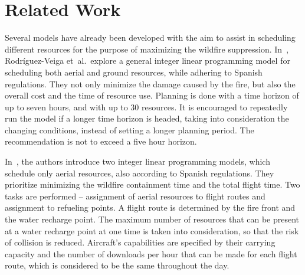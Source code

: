 \chapter{Related Work}\label{chap:related-work}

Several models have already been developed with the aim to assist in scheduling different resources for the purpose of maximizing the wildfire suppression.
In~\cite{Veiga/FullScheduler}, Rodríguez-Veiga et~al.\ explore a general integer linear programming model for scheduling both aerial and ground resources, while adhering to Spanish regulations.
They not only minimize the damage caused by the fire, but also the overall cost and the time of resource use.
Planning is done with a time horizon of up to seven hours, and with up to 30 resources.
It is encouraged to repeatedly run the model if a longer time horizon is headed, taking into consideration the changing conditions, instead of setting a longer planning period.
The recommendation is not to exceed a five hour horizon.

In~\cite{Veiga/AerialScheduler}, the authors introduce two integer linear programming models, which schedule only aerial resources, also according to Spanish regulations.
They prioritize minimizing the wildfire containment time and the total flight time.
Two tasks are performed -- assignment of aerial resources to flight routes and assignment to refueling points.
A flight route is determined by the fire front and the water recharge point.
The maximum number of resources that can be present at a water recharge point at one time is taken into consideration, so that the risk of collision is reduced.
Aircraft's capabilities are specified by their carrying capacity and the number of downloads per hour that can be made for each flight route, which is considered to be the same throughout the day.

